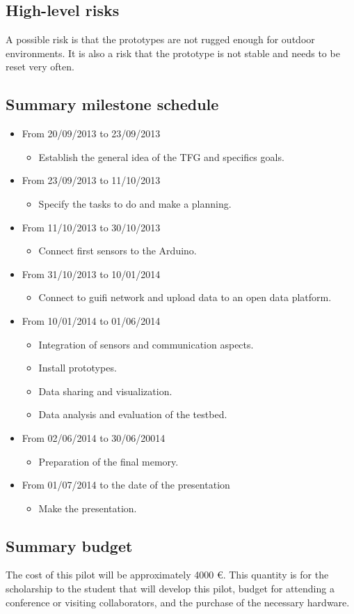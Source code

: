 \documentclass[10pt,a4paper]{article}
\begin{document}
\subsection{High-level risks}
A possible risk is that the prototypes are not rugged enough for outdoor environments.
It is also a risk that the prototype is not stable and needs to be reset very often.

\subsection{Summary milestone schedule}
\begin{itemize}
\item From 20/09/2013 to 23/09/2013
	\begin{itemize}
	\item Establish the general idea of the TFG and specifics goals.
	\end{itemize}
\item From 23/09/2013 to 11/10/2013
	\begin{itemize}
	\item Specify the tasks to do and make a planning.
	\end{itemize}
\item From 11/10/2013 to 30/10/2013
	\begin{itemize}
	\item Connect first sensors to the Arduino.
	\end{itemize}
\item From 31/10/2013 to 10/01/2014
	\begin{itemize}
	\item Connect to guifi network and upload data to an open data platform.
	\end{itemize}
\item From 10/01/2014 to 01/06/2014
	\begin{itemize}
	\item Integration of sensors and communication aspects.
	\item Install prototypes.
	\item Data sharing and visualization.
    \item Data analysis and evaluation of the testbed.
	\end{itemize}
\item From 02/06/2014 to 30/06/20014
	\begin{itemize}
	\item Preparation of the final memory.
	\end{itemize}
\item From 01/07/2014 to the date of the presentation
	\begin{itemize}
	\item Make the presentation.
	\end{itemize}
\end{itemize}

\subsection{Summary budget}
The cost of this pilot will be approximately 4000 €. This quantity is for the scholarship to the student that will develop this pilot, budget for attending a conference or visiting collaborators, and the purchase of the necessary hardware.
\end{document}
